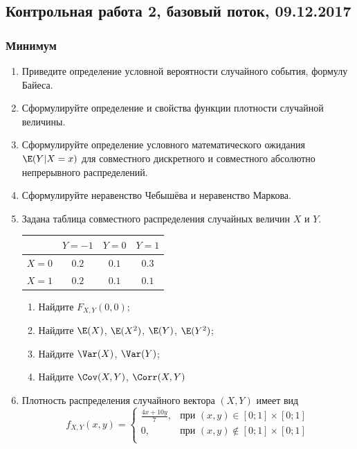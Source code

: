 \subsection{Контрольная работа 2, базовый поток, 09.12.2017}



\subsubsection{Минимум}

\begin{enumerate}
\item Приведите определение условной вероятности случайного события, формулу Байеса.
\item Сформулируйте определение и свойства функции плотности случайной величины.
\item Сформулируйте определение  условного математического ожидания $\E(Y|X=x)$ для совместного дискретного и совместного абсолютно непрерывного распределений.
\item Сформулируйте неравенство Чебышёва и неравенство Маркова.

\item Задана таблица совместного распределения случайных величин $X$ и $Y$.
\begin{center}
\begin{tabular}{lccc}
\toprule
                       & $Y=-1$  & $Y=0$   & $Y=1$   \\
 \midrule
$X=0$                 & $0.2$ & $0.1$ & $0.3$ \\
 $X=1$                 & $0.2$ & $0.1$ & $0.1$ \\
 \bottomrule
\end{tabular}
\end{center}


\begin{enumerate}
    \item Найдите $F_{X,Y}(0, 0)$;
    \item Найдите $\E(X)$, $\E(X^2)$, $\E(Y)$, $\E(Y^2)$;
    \item Найдите $\Var(X)$, $\Var(Y)$;
    \item Найдите $\Cov(X, Y)$, $\Corr(X, Y)$
\end{enumerate}
\item Плотность распределения случайного вектора $(X,Y)$ имеет вид
\[
f_{X,Y}(x,y) =
\begin{cases}
\frac{4x+10y}{7}, & \text{при } (x,y) \in [0;1] \times [0;1] \\
0 , & \text{при } (x,y) \not\in [0;1] \times [0;1] \\
\end{cases}
\]


\end{enumerate}
